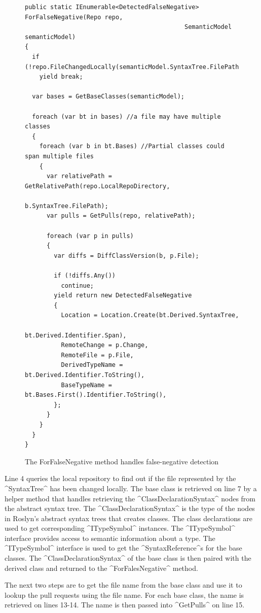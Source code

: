 \documentclass[draftclsnofoot,onecolumn]{IEEEtran}
\begin{document}
\begin{figure}[ht]
\centering
\begin{lstlisting}
public static IEnumerable<DetectedFalseNegative> ForFalseNegative(Repo repo,
                                            SemanticModel semanticModel)
{
  if (!repo.FileChangedLocally(semanticModel.SyntaxTree.FilePath))
    yield break;

  var bases = GetBaseClasses(semanticModel);

  foreach (var bt in bases) //a file may have multiple classes
  {
    foreach (var b in bt.Bases) //Partial classes could span multiple files
    {
      var relativePath = GetRelativePath(repo.LocalRepoDirectory, 
                                                        b.SyntaxTree.FilePath);
      var pulls = GetPulls(repo, relativePath);

      foreach (var p in pulls)
      {
        var diffs = DiffClassVersion(b, p.File);

        if (!diffs.Any())
          continue;
        yield return new DetectedFalseNegative
        {
          Location = Location.Create(bt.Derived.SyntaxTree, 
                                                   bt.Derived.Identifier.Span),
          RemoteChange = p.Change,
          RemoteFile = p.File,
          DerivedTypeName = bt.Derived.Identifier.ToString(),
          BaseTypeName = bt.Bases.First().Identifier.ToString(),
        };
      }
    }
  }
}
\end{lstlisting}
\caption{The ForFalseNegative method handles false-negative detection}
\label{anforfn}
\end{figure}


Line 4 queries the local repository to find out if the file represented by the ^SyntaxTree^ has been changed locally. The base class is retrieved on line 7 by a helper method that handles retrieving the 
^ClassDeclarationSyntax^ nodes from the abstract syntax tree. The ^ClassDeclarationSyntax^ is the type of the nodes in Roslyn's abstract syntax trees that creates classes. The class declarations are used to get corresponding ^ITypeSymbol^ instances. The ^ITypeSymbol^ interface provides access to semantic information about a type. The ^ITypeSymbol^ interface is used to get the ^SyntaxReference^s for the base classes. The ^ClassDeclarationSyntax^ of the base class is then paired with the derived class and returned to the ^ForFalesNegative^ method.

The next two steps are to get the file name from the base class and use it to lookup the pull requests using the file name. For each base class, the name is retrieved on lines 13-14. The name is then passed into ^GetPulls^ on line 15.
\end{document}
